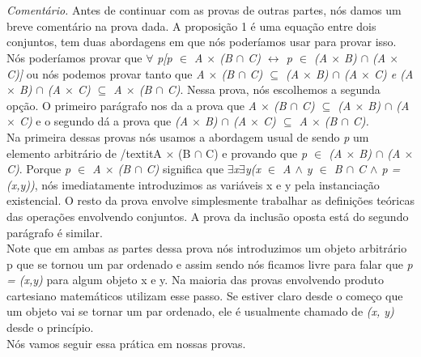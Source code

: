 \\
\\
\textit{Comentário.} Antes de continuar com as provas de outras partes, nós damos um breve comentário na prova dada. A proposição
1 é uma equação entre dois conjuntos, tem duas abordagens em que nós poderíamos usar para provar isso. Nós poderíamos provar que
$\forall$	\textit{p[p $\in$ A $\times$ (B $\cap$ C) $\leftrightarrow$ p $\in$ (A $\times$ B) $\cap$ (A $\times$ C)]} ou nós podemos 
provar tanto que \textit{A $\times$ (B $\cap$ C) $\subseteq$ (A $\times$ B) $\cap$ (A $\times$ C) e (A $\times$ B) $\cap$
(A $\times$ C) $\subseteq$ A $\times$ (B $\cap$ C)}. Nessa prova, nós escolhemos a segunda opção. O primeiro parágrafo nos da 
a prova que \textit{A $\times$ (B $\cap$ C) $\subseteq$ (A $\times$ B) $\cap$ (A $\times$ C)} e o segundo dá a prova que 
\textit{(A $\times$ B) $\cap$ (A $\times$ C) $\subseteq$ A $\times$ (B $\cap$ C).}
\\
Na primeira dessas provas nós usamos a abordagem usual de sendo \textit{p} um elemento arbitrário de /textit{A $\times$ (B $\cap$ C)}
  e provando que \textit{p $\in$ (A $\times$ B) $\cap$ (A $\times$ C)}. Porque \textit{p $\in$ A $\times$ (B $\cap$ C)}
   significa que \textit{$\exists$x$\exists$y(x $\in$ A $\wedge$ y $\in$ B $\cap$ C $\wedge$ p = (x,y))}, nós imediatamente 
   introduzimos as variáveis x e y pela instanciação existencial. O resto da prova envolve simplesmente trabalhar as definições
   teóricas das operações envolvendo conjuntos. A prova da inclusão oposta está do segundo parágrafo é similar.
\\
  Note que em ambas as partes dessa prova nós introduzimos um objeto arbitrário p que se tornou um par ordenado e assim sendo
  nós ficamos livre para falar que \textit{p = (x,y)} para algum objeto x e y. Na maioria das provas envolvendo produto cartesiano
  matemáticos utilizam esse passo. Se estiver claro desde o começo que um objeto vai se tornar um par ordenado, ele é usualmente
  chamado de \textit{(x, y)} desde o princípio.
\\ Nós vamos seguir essa prática em nossas provas.

  
